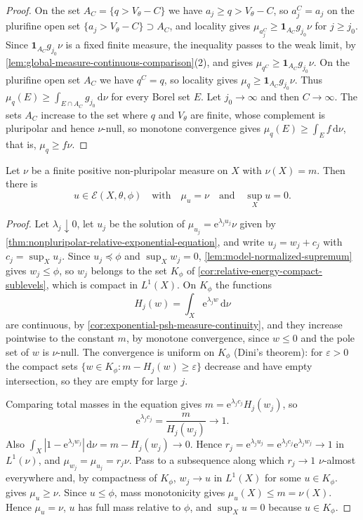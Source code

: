 \begin{proof}
On the set $A_C=\{q>V_\theta-C\}$ we have $a_j\geq q>V_\theta-C$, so $a_j^C=a_j$ on the plurifine open set $\{a_j>V_\theta-C\}\supset A_C$, and locality gives $\mu_{a_j^C}\geq\mathbf1_{A_C}g_{j_0}\nu$ for $j\geq j_0$. Since $\mathbf1_{A_C}g_{j_0}\nu$ is a fixed finite measure, the inequality passes to the weak limit, by \cref{lem:global-measure-continuous-comparison}(2), and gives $\mu_{q^C}\geq\mathbf1_{A_C}g_{j_0}\nu$. On the plurifine open set $A_C$ we have $q^C=q$, so locality gives $\mu_q\geq\mathbf1_{A_C}g_{j_0}\nu$. Thus $\mu_q(E)\geq\int_{E\cap A_C}g_{j_0}\,\mathrm d\nu$ for every Borel set $E$. Let $j_0\to\infty$ and then $C\to\infty$. The sets $A_C$ increase to the set where $q$ and $V_\theta$ are finite, whose complement is pluripolar and hence $\nu$-null, so monotone convergence gives $\mu_q(E)\geq\int_Ef\,\mathrm d\nu$, that is, $\mu_q\geq f\nu$.
\end{proof}

\begin{theorem}\label{thm:nonpluripolar-relative-prescribed-measure-existence}
Let $\nu$ be a finite positive non-pluripolar measure on $X$ with $\nu(X)=m$. Then there is
\[
 u\in\mathcal E(X,\theta,\phi)\quad\text{with}\quad
                \mu_u=\nu\quad\text{and}\quad\sup_Xu=0.
\]
\end{theorem}
\begin{proof}
Let $\lambda_j\downarrow0$, let $u_j$ be the solution of $\mu_{u_j}=\mathrm e^{\lambda_ju_j}\nu$ given by \cref{thm:nonpluripolar-relative-exponential-equation}, and write $u_j=w_j+c_j$ with $c_j=\sup_Xu_j$. Since $u_j\preceq\phi$ and $\sup_Xw_j=0$, \cref{lem:model-normalized-supremum} gives $w_j\leq\phi$, so $w_j$ belongs to the set $K_\phi$ of \cref{cor:relative-energy-compact-sublevels}, which is compact in $L^1(X)$. On $K_\phi$ the functions
\[
 H_j(w)=\int_X\mathrm e^{\lambda_jw}\,\mathrm d\nu
\]
are continuous, by \cref{cor:exponential-psh-measure-continuity}, and they increase pointwise to the constant $m$, by monotone convergence, since $w\leq0$ and the pole set of $w$ is $\nu$-null. The convergence is uniform on $K_\phi$ (Dini's theorem): for $\varepsilon>0$ the compact sets $\{w\in K_\phi:m-H_j(w)\geq\varepsilon\}$ decrease and have empty intersection, so they are empty for large $j$.

Comparing total masses in the equation gives $m=\mathrm e^{\lambda_jc_j}H_j(w_j)$, so
\[
 \mathrm e^{\lambda_jc_j}=\frac m{H_j(w_j)}\longrightarrow1.
\]
Also $\int_X|1-\mathrm e^{\lambda_jw_j}|\,\mathrm d\nu=m-H_j(w_j)\to0$. Hence $r_j=\mathrm e^{\lambda_ju_j}=\mathrm e^{\lambda_jc_j}\mathrm e^{\lambda_jw_j}\to1$ in $L^1(\nu)$, and $\mu_{w_j}=\mu_{u_j}=r_j\nu$. Pass to a subsequence along which $r_j\to1$ $\nu$-almost everywhere and, by compactness of $K_\phi$, $w_j\to u$ in $L^1(X)$ for some $u\in K_\phi$.  gives $\mu_u\geq\nu$. Since $u\leq\phi$, mass monotonicity gives $\mu_u(X)\leq m=\nu(X)$. Hence $\mu_u=\nu$, $u$ has full mass relative to $\phi$, and $\sup_Xu=0$ because $u\in K_\phi$.
\end{proof}

